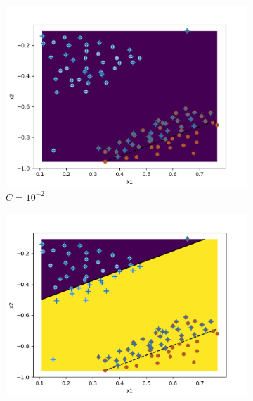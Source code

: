 \begin{figure}[H]
	\begin{subfigure}{0.48\textwidth}
    	\includegraphics[width=\linewidth, height=1\linewidth]{img/10_-2}	
    	\caption{$C = 10^{-2}$}
	\end{subfigure}
	\hfill
	\begin{subfigure}{0.48\textwidth}
    	\includegraphics[width=\linewidth, height=1\linewidth]{img/10_-1}	

\end{subfigure}
\end{figure}
